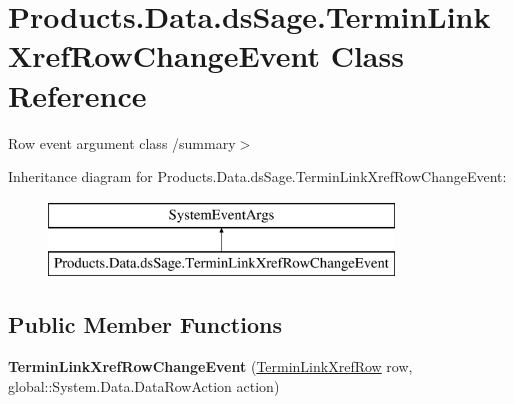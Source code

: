 \hypertarget{class_products_1_1_data_1_1ds_sage_1_1_termin_link_xref_row_change_event}{}\section{Products.\+Data.\+ds\+Sage.\+Termin\+Link\+Xref\+Row\+Change\+Event Class Reference}
\label{class_products_1_1_data_1_1ds_sage_1_1_termin_link_xref_row_change_event}


Row event argument class /summary$>$  


Inheritance diagram for Products.\+Data.\+ds\+Sage.\+Termin\+Link\+Xref\+Row\+Change\+Event\+:\begin{figure}[H]
\begin{center}
\leavevmode
\includegraphics[height=2.000000cm]{class_products_1_1_data_1_1ds_sage_1_1_termin_link_xref_row_change_event}
\end{center}
\end{figure}
\subsection*{Public Member Functions}
\begin{DoxyCompactItemize}
\item 
{\bfseries Termin\+Link\+Xref\+Row\+Change\+Event} (\hyperlink{class_products_1_1_data_1_1ds_sage_1_1_termin_link_xref_row}{Termin\+Link\+Xref\+Row} row, global\+::\+System.\+Data.\+Data\+Row\+Action action)\hypertarget{class_products_1_1_data_1_1ds_sage_1_1_termin_link_xref_row_change_event_a248c2f1741e808e367b2e30e7d940ea9}{}\label{class_products_1_1_data_1_1ds_sage_1_1_termin_link_xref_row_change_event_a248c2f1741e808e367b2e30e7d940ea9}

\end{DoxyCompactItemize}
